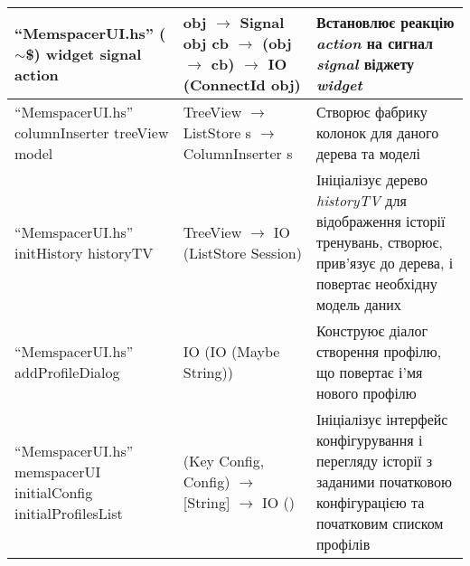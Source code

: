 \begin{longtable}{| C{6cm} | C{4cm} | C{5cm} |}
  \hline
  ``MemspacerUI.hs'' \newline ($\sim$\$) \newline widget signal action
  & obj \newline $\to$ Signal obj cb \newline
  $\to$ (obj $\to$ cb) \newline $\to$ IO (ConnectId obj)
  & Встановлює реакцію \emph{action} на сигнал \emph{signal} віджету \emph{widget} \\
  \hline
  ``MemspacerUI.hs'' \newline columnInserter \newline treeView model
  & TreeView \newline $\to$ ListStore s $\to$ ColumnInserter s
  & Створює фабрику колонок для даного дерева та моделі \\
  \hline
  ``MemspacerUI.hs'' \newline initHistory \newline historyTV
  & TreeView $\to$ IO (ListStore Session)
  & Ініціалізує дерево \emph{historyTV} для відображення історії тренувань,
  створює, прив'язує до дерева, і повертає необхідну модель даних \\
  \hline
  ``MemspacerUI.hs'' \newline addProfileDialog
  & IO (IO (Maybe String))
  & Конструює діалог створення профілю, що повертає і'мя нового профілю \\
  \hline
  ``MemspacerUI.hs'' \newline memspacerUI \newline
  initialConfig initialProfilesList
  & (Key Config, Config) $\to$ [String] $\to$ IO ()
  & Ініціалізує інтерфейс конфігурування і перегляду історії
  з заданими початковою конфігурацією та початковим списком профілів \\
  \hline
\end{longtable}\normalsize